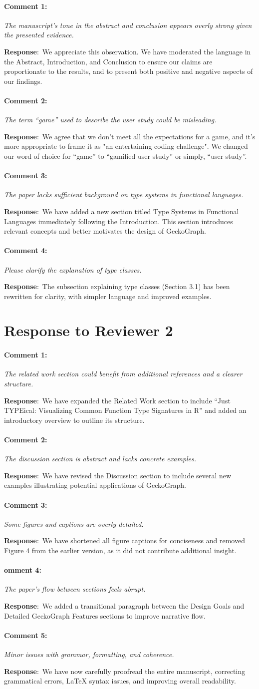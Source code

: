 \documentclass{article}
\newcommand{\pointRaised}[2]{\medskip \noindent 
               \paragraph{#1} \textsl{#2}}
\newcommand{\reply}{\noindent \textbf{Response}:\ }
\begin{document}
\pointRaised{Comment 1:}{ The manuscript’s tone in the abstract and conclusion appears overly strong given the presented evidence.}

\reply We appreciate this observation. We have moderated the language in the Abstract, Introduction, and Conclusion to ensure our claims are proportionate to the results, and to present both positive and negative aspects of our findings.

\pointRaised{Comment 2:}{The term “game” used to describe the user study could be misleading.}

\reply We agree that we don't meet all the expectations for a game, and it's more appropriate to frame it as "an entertaining coding challenge". We changed our word of choice for “game” to “gamified user study” or simply, “user study”.  

\pointRaised{Comment 3:}{The paper lacks sufficient background on type systems in functional languages.}

\reply We have added a new section titled Type Systems in Functional Languages immediately following the Introduction. This section introduces relevant concepts and better motivates the design of GeckoGraph.

\pointRaised{Comment 4:}{Please clarify the explanation of type classes.}

\reply The subsection explaining type classes (Section 3.1) has been rewritten for clarity, with simpler language and improved examples.

\section{Response to Reviewer 2}

\pointRaised{Comment 1:}{The related work section could benefit from additional references and a clearer structure.}

\reply We have expanded the Related Work section to include “Just TYPEical: Visualizing Common Function Type Signatures in R” and added an introductory overview to outline its structure.

\pointRaised{Comment 2:}{The discussion section is abstract and lacks concrete examples.}

\reply We have revised the Discussion section to include several new examples illustrating potential applications of GeckoGraph.

\pointRaised{Comment 3:}{Some figures and captions are overly detailed.}

\reply We have shortened all figure captions for conciseness and removed Figure 4 from the earlier version, as it did not contribute additional insight.

\pointRaised{omment 4:}{The paper’s flow between sections feels abrupt.}

\reply We added a transitional paragraph between the Design Goals and Detailed GeckoGraph Features sections to improve narrative flow.

\pointRaised{Comment 5:}{Minor issues with grammar, formatting, and coherence.}

\reply We have now carefully proofread the entire manuscript, correcting grammatical errors, LaTeX syntax issues, and improving overall readability.
\end{document}
